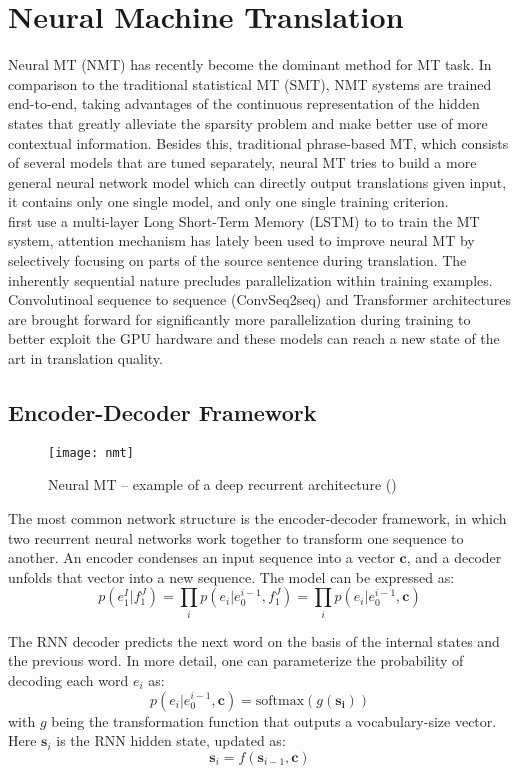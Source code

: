 \section{Neural Machine Translation}
Neural MT (NMT) has recently become the dominant method for MT task. In comparison to the traditional statistical MT (SMT), NMT systems are trained end-to-end, taking advantages of the continuous representation of the hidden states that greatly alleviate the sparsity problem and make better use of more contextual information. Besides this, traditional phrase-based MT, which consists of several models that are tuned separately, neural MT tries to build a more general neural network model which can directly output translations given input, it contains only one single model, and only one single training criterion. \\
\cite{sutskever2014sequence} first use a multi-layer Long Short-Term Memory (LSTM) to to train the MT system, attention mechanism has lately been used to improve neural MT by selectively focusing on parts of the source sentence during translation. The inherently sequential nature precludes parallelization within training examples. Convolutinoal sequence to sequence (ConvSeq2seq) and Transformer architectures are brought forward  for significantly more parallelization during training to better exploit the GPU hardware and these models can reach a new state of the art in
translation quality.


\subsection{Encoder-Decoder Framework}
\begin{figure}[t]
	\texttt{[image: nmt]}
	\caption{ Neural MT – example of a deep recurrent architecture (\cite{luong2015effective})}
	\centering
\end{figure}

The most common network structure is the encoder-decoder framework, in which two recurrent neural networks work together to transform one sequence to another. An encoder condenses an input sequence into a vector $\bm{c}$, and a decoder unfolds that vector into a new sequence. The model can be expressed as:
\[ p(e_1^I | f_1^J) = \prod_{i} p(e_i|e_0^{i-1}, f_1^J) = \prod_{i} {p(e_i|e_0^{i-1},  {\bm{c}})} \] 

 The RNN decoder predicts the next word on the basis of the internal states and the previous word. In more detail, one can parameterize the probability of decoding each word $e_i$ as:
 \[ p(e_i|e_0^{i-1},  {\bm{c}}) = \text{softmax}(g(\bm{s_i}))\]
 with $g$ being the transformation function that outputs a vocabulary-size vector. Here $\bm{s}_i$ is the RNN hidden state, updated as:
\[ \bm{s}_i = f(\bm{s}_{i-1}, \bm{c})\]

